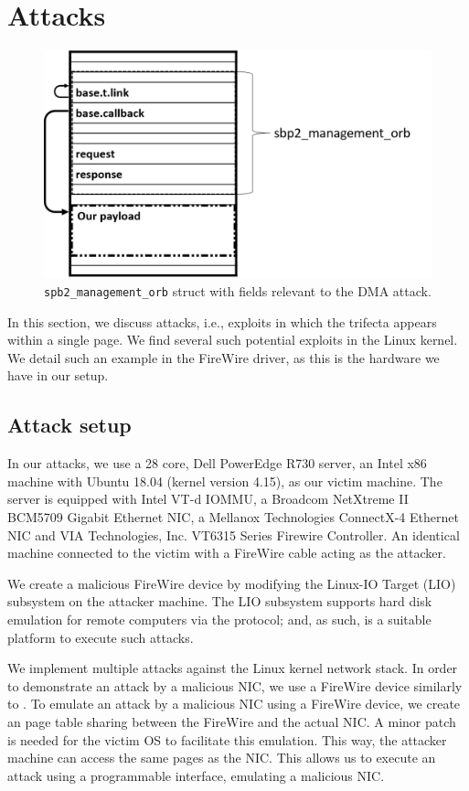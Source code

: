 \section{\Simple{} Attacks}\label{sec:attack_setup}
\begin{figure}
    \centering
    \includegraphics[width=1\linewidth]{figs/sbp.png}
    \caption{\texttt{spb2\_management\_orb} struct with fields relevant to the DMA attack.}
    \label{fig:orb}
\end{figure}
In this section, we discuss \simple{} attacks, i.e., exploits in which the trifecta appears within a single page.
We find several such potential \simple{} exploits in the Linux kernel. We detail such an example in the FireWire driver, as this is the hardware we have in our setup. 



\subsection{Attack setup}
In our attacks, we use a 28 core, Dell PowerEdge R730 server, an Intel x86 machine with Ubuntu 18.04 (kernel version 4.15), as our victim machine. The server is equipped with Intel VT-d IOMMU, a Broadcom NetXtreme II BCM5709 Gigabit Ethernet NIC, a Mellanox Technologies ConnectX-4 Ethernet NIC and VIA Technologies, Inc. VT6315 Series Firewire Controller. An identical machine connected to the victim with a FireWire cable acting as the attacker. 

We create a malicious FireWire device by modifying the Linux-IO Target (LIO) subsystem on the attacker machine. The LIO subsystem supports hard disk emulation for remote computers via the \spb{} protocol; and, as such, is a suitable platform to execute such attacks. 

We implement multiple attacks against the Linux kernel network stack. In order to demonstrate an attack by a malicious NIC, we use a FireWire device similarly to \cite{SLND10}. To emulate an attack by a malicious NIC using a FireWire device, we create an \iova{} page table sharing between the FireWire and the actual NIC. A minor patch is needed for the victim OS to facilitate this emulation. This way, the attacker machine can access the same pages as the NIC. This allows us to execute an attack using a programmable interface, emulating a malicious NIC.

